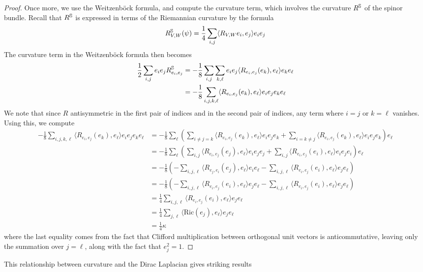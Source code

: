 \begin{proof} %
Once more, we use the Weitzenb\"ock formula, and compute the curvature term, which
involves the curvature $R^\S$ of the spinor bundle. Recall that $R^\S$ is expressed
in terms of the Riemannian curvature by the formula
\[
R^\S_{V,W}(\psi) = \frac{1}{4}\sum_{i, j}\langle R_{V,W}e_i, e_j \rangle e_ie_j
\]
The curvature term in the Weitzenb\"ock formula then becomes
\begin{align*}
\frac{1}{2}\sum_{i,j}e_ie_jR^\S_{e_i,e_j}
&= -\frac{1}{8}\sum_{i,j}\sum_{k,\ell}e_ie_j\langle R_{e_i, e_j}(e_k), e_\ell \rangle
e_ke_\ell \\
&= -\frac{1}{8}\sum_{i,j,k,\ell} \langle R_{e_i, e_j}(e_k), e_\ell \rangle
e_ie_je_ke_\ell
\end{align*}
We note that since $R$ antisymmetric in the first pair of indices and in the
second pair of indices, any term where $i = j$ or $k = \ell$ vanishes.
Using this, we compute
\begin{align*}
-\frac{1}{8}\sum_{i,j,k,\ell} \langle R_{e_i, e_j}(e_k), e_\ell \rangle e_ie_je_ke_\ell
&= -\frac{1}{8} \sum_\ell \left( \sum_{i \neq j = k}
\langle R_{e_i, e_j}(e_k), e_\ell \rangle e_ie_je_k + \sum_{i = k \neq j}  \langle
R_{e_i, e_j}(e_k), e_\ell \rangle e_ie_je_k\right)e_\ell \\
&= -\frac{1}{8}\sum_\ell \left( \sum_{i,j} \langle R_{e_i, e_j}(e_j), e_\ell \rangle
e_ie_je_j + \sum_{i,j} \langle R_{e_i, e_j}(e_i), e_\ell \rangle e_ie_je_i\right)
e_\ell \\
&= -\frac{1}{8} \left(-\sum_{i,j,\ell} \langle R_{e_j,e_i}(e_j), e_\ell \rangle
e_ie_\ell - \sum_{i,j,\ell} \langle R_{e_i, e_j}(e_i), e_\ell \rangle e_je_\ell\right) \\
&= -\frac{1}{8} \left(-\sum_{i,j,\ell} \langle R_{e_i,e_j}(e_i), e_\ell \rangle
e_je_\ell - \sum_{i,j,\ell} \langle R_{e_i, e_j}(e_i), e_\ell \rangle e_je_\ell\right) \\
&= \frac{1}{4} \sum_{i,j,\ell} \langle R_{e_i, e_j}(e_i), e_\ell \rangle e_je_\ell \\
&= \frac{1}{4} \sum_{j, \ell} \langle \mathrm{Ric}(e_j), e_\ell \rangle e_je_\ell \\
&= \frac{1}{4} \kappa
\end{align*}
where the last equality comes from the fact that Clifford multiplication between
orthogonal unit vectors is anticommutative, leaving only the summation over $j = \ell$,
along with the fact that $e_j^2 = 1$.
\end{proof}
%
This relationship between curvature and the Dirac Laplacian gives striking results
